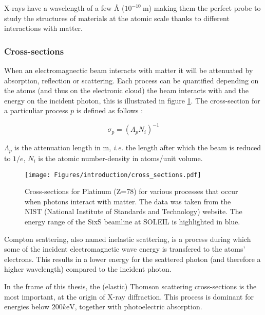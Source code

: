 X-rays have a wavelength of a few \si{\angstrom} ($10^{-10} \:\si{\meter}$) making them the perfect probe to study the structures of materials at the atomic scale thanks to different interactions with matter.

\subsubsection{Cross-sections}

When an electromagnectic beam interacts with matter it will be attenuated by absorption, reflection or scattering.
Each process can be quantified depending on the atoms (and thus on the electronic cloud) the beam interacts with and the energy on the incident photon, this is illustrated in figure \ref{fig:cross_sections}.
The cross-section for a particuliar process $p$ is defined as follows \parencite{Willmott}:

\begin{equation}
	\sigma_p = (\Lambda_p N_i)^{-1}
\end{equation}

$\Lambda_p$ is the attenuation length in \si{\meter}, \textit{i.e.} the length after which the beam is reduced to $1/e$, $N_i$ is the atomic number-density in atoms/unit volume.

\begin{figure}[!htb]
    \centering
    \texttt{[image: Figures/introduction/cross\_sections.pdf]}
    \caption{Cross-sections for Platinum (Z=78) for various processes that occur when photons interact with matter. The data was taken from the NIST (National Institute of Standards and Technology) \parencite{NIST_cross_sections} website. The energy range of the SixS beamline at SOLEIL is highlighted in blue.}
    \label{fig:cross_sections}
\end{figure}

Compton scattering, also named inelastic scattering, is a process during which some of the incident electromagnetic wave energy is transfered to the atoms' electrons.
This results in a lower energy for the scattered photon (and therefore a higher wavelength) compared to the incident photon.

In the frame of this thesis, the (elastic) Thomson scattering cross-sections is the most important, at the origin of X-ray diffraction.
This process is dominant for energies below $200 \si{k\electronvolt}$, together with photoelectric absorption.%

